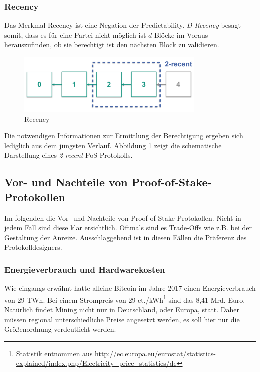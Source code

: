 \subsubsection{Recency}
\label{subsec:recency}

Das Merkmal Recency ist eine Negation der Predictability. \textit{D-Recency} besagt somit, dass es für eine Partei nicht möglich ist $d$ Blöcke im Voraus herauszufinden, ob sie berechtigt ist den nächsten Block zu validieren.

\begin{figure}[htb] 
	\centerline{\includegraphics*[width=0.8\textwidth]{img/recency}}
\caption{Recency}
\label{fig:recency}
\end{figure}

Die notwendigen Informationen zur Ermittlung der Berechtigung ergeben sich lediglich aus dem jüngsten Verlauf. Abbildung \ref{fig:recency} zeigt die schematische Darstellung eines \textit{2-recent} PoS-Protokolls. 

\subsection{Vor- und Nachteile von Proof-of-Stake-Protokollen}

Im folgenden die Vor- und Nachteile von Proof-of-Stake-Protokollen. Nicht in jedem Fall sind diese klar ersichtlich. Oftmals sind es Trade-Offs wie z.B. bei der Gestaltung der Anreize. Ausschlaggebend ist in diesen Fällen die Präferenz des Protokolldesigners.

\subsubsection{Energieverbrauch und Hardwarekosten}

Wie eingangs erwähnt hatte alleine Bitcoin im Jahre 2017 einen Energieverbrauch von 29 TWh. Bei einem Strompreis von 29 ct./kWh\footnote{Statistik entnommen aus \url{http://ec.europa.eu/eurostat/statistics-explained/index.php/Electricity_price_statistics/de}} sind das 8,41 Mrd. Euro. Natürlich findet Mining nicht nur in Deutschland, oder Europa, statt. Daher müssen regional unterschiedliche Preise angesetzt werden, es soll hier nur die Größenordnung verdeutlicht werden.

